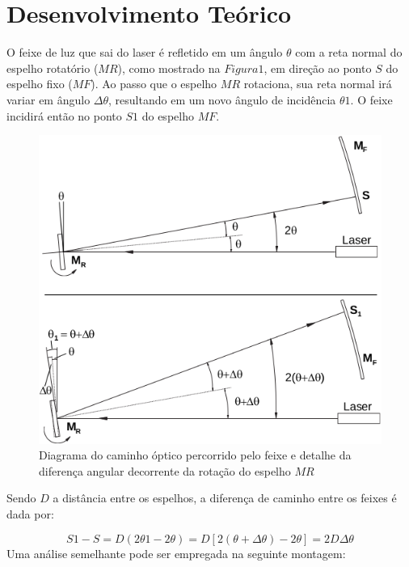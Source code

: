 \section{Desenvolvimento Teórico}
O feixe de luz que sai do laser é refletido em um ângulo $\theta$ com a reta normal do espelho rotatório ($MR$), como mostrado na $Figura 1$, em direção ao ponto $S$ do espelho fixo ($MF$). Ao passo que o espelho $MR$ rotaciona, sua reta normal irá variar em ângulo  $\Delta \theta$, resultando em um novo ângulo de incidência $\theta1$. O feixe incidirá então no ponto $S1$ do espelho $MF$.
\begin{figure}[!ht]
	\centering
	\includegraphics[scale=0.4]{2.png}
	\caption{Diagrama do caminho óptico percorrido pelo feixe e detalhe da diferença angular decorrente da rotação do espelho $MR$}
\end{figure} 
Sendo $D$ a distância entre os espelhos, a diferença de caminho entre os feixes é dada por:

\begin{equation}
	S1-S = D(2\theta1 - 2\theta)=D[2(\theta+\Delta\theta)-2\theta]= 2D\Delta		\theta
\end{equation}
Uma análise semelhante pode ser empregada na seguinte montagem:

